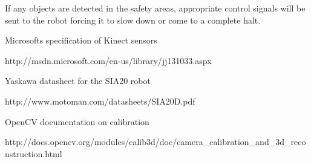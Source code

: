 \documentclass[10pt,a4paper,twocolumn,english]{article}
\begin{document}
If any objects are detected in the safety areas, appropriate control signals will be sent to the robot forcing it to slow down or come to a complete halt.

\clearpage

\begin{thebibliography}{9}

Microsofts specification of Kinect sensors

http://msdn.microsoft.com/en-us/library/jj131033.aspx

Yaskawa datasheet for the SIA20 robot

http://www.motoman.com/datasheets/SIA20D.pdf

OpenCV documentation on calibration

http://docs.opencv.org/modules/calib3d/doc/camera\_calibration\_and\_3d\_reconstruction.html


\end{thebibliography}
\end{document}
